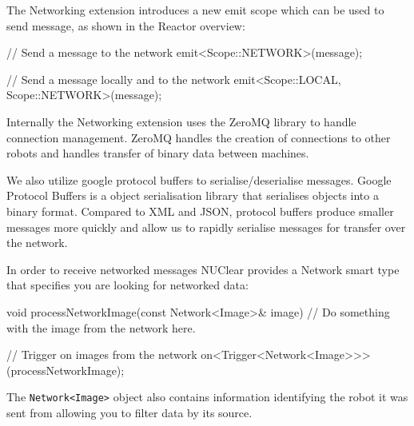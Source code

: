 \documentclass[english,12pt]{scrartcl}
\begin{document}
				The Networking extension introduces a new emit scope which can be used to send message, as shown in the Reactor overview:

				\begin{cppcode}
					// Send a message to the network
					emit<Scope::NETWORK>(message);

					// Send a message locally and to the network
					emit<Scope::LOCAL, Scope::NETWORK>(message);
				\end{cppcode}

				Internally the Networking extension uses the ZeroMQ library to handle connection management.
				ZeroMQ handles the creation of connections to other robots and handles transfer of binary data between machines.

				We also utilize google protocol buffers to serialise/deserialise messages.
				Google Protocol Buffers is a object serialisation library that serialises objects into a binary format.
				Compared to XML and JSON, protocol buffers produce smaller messages more quickly and allow us to rapidly serialise messages for transfer over the network.

				In order to receive networked messages NUClear provides a Network smart type that specifies you are looking for networked data:

				\begin{cppcode}
					void processNetworkImage(const Network<Image>& image) {
					    // Do something with the image from the network here.
					}

					// Trigger on images from the network
					on<Trigger<Network<Image>>>(processNetworkImage);
				\end{cppcode}

				The \texttt{Network<Image>} object also contains information identifying the robot it was sent from allowing you to filter data by its source.
\end{document}
